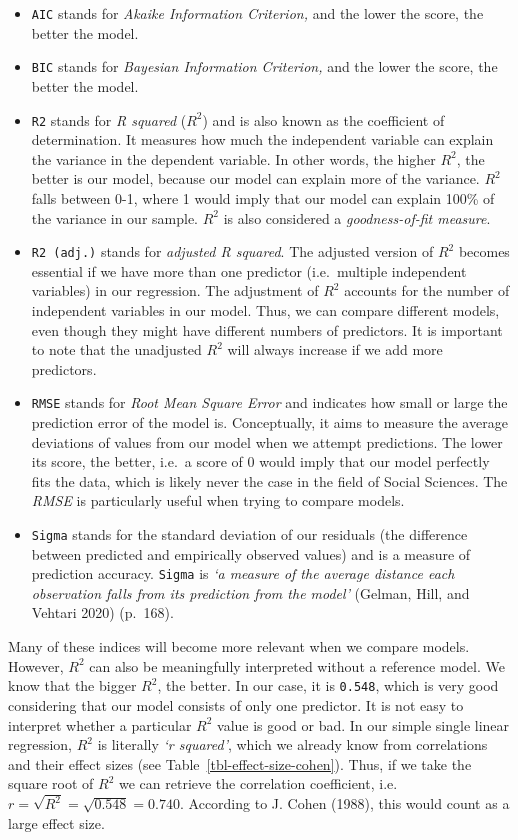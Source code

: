 \documentclass[
  letterpaper,
]{krantz}
\begin{document}
\begin{itemize}
\item
  \texttt{AIC} stands for \emph{Akaike Information Criterion,} and the
  lower the score, the better the model.
\item
  \texttt{BIC} stands for \emph{Bayesian Information Criterion,} and the
  lower the score, the better the model.
\item
  \texttt{R2} stands for \emph{R squared} (\(R^2\)) and is also known as
  the coefficient of determination. It measures how much the independent
  variable can explain the variance in the dependent variable. In other
  words, the higher \(R^2\), the better is our model, because our model
  can explain more of the variance. \(R^2\) falls between 0-1, where 1
  would imply that our model can explain 100\% of the variance in our
  sample. \(R^2\) is also considered a \emph{goodness-of-fit measure}.
\item
  \texttt{R2\ (adj.)} stands for \emph{adjusted R squared}. The adjusted
  version of \(R^2\) becomes essential if we have more than one
  predictor (i.e.~multiple independent variables) in our regression. The
  adjustment of \(R^2\) accounts for the number of independent variables
  in our model. Thus, we can compare different models, even though they
  might have different numbers of predictors. It is important to note
  that the unadjusted \(R^2\) will always increase if we add more
  predictors.
\item
  \texttt{RMSE} stands for \emph{Root Mean Square Error} and indicates
  how small or large the prediction error of the model is. Conceptually,
  it aims to measure the average deviations of values from our model
  when we attempt predictions. The lower its score, the better, i.e.~a
  score of 0 would imply that our model perfectly fits the data, which
  is likely never the case in the field of Social Sciences. The
  \emph{RMSE} is particularly useful when trying to compare models.
\item
  \texttt{Sigma} stands for the standard deviation of our residuals (the
  difference between predicted and empirically observed values) and is a
  measure of prediction accuracy. \texttt{Sigma} is \emph{`a measure of
  the average distance each observation falls from its prediction from
  the model'} (Gelman, Hill, and Vehtari 2020) (p.~168).
\end{itemize}

Many of these indices will become more relevant when we compare models.
However, \(R^2\) can also be meaningfully interpreted without a
reference model. We know that the bigger \(R^2\), the better. In our
case, it is \texttt{0.548}, which is very good considering that our
model consists of only one predictor. It is not easy to interpret
whether a particular \(R^2\) value is good or bad. In our simple single
linear regression, \(R^2\) is literally \emph{`r squared'}, which we
already know from correlations and their effect sizes (see
Table~\ref{tbl-effect-size-cohen}). Thus, if we take the square root of
\(R^2\) we can retrieve the correlation coefficient,
i.e.~\(r = \sqrt{R^2} = \sqrt{0.548} = 0.740\). According to J. Cohen
(1988), this would count as a large effect size.
\end{document}
